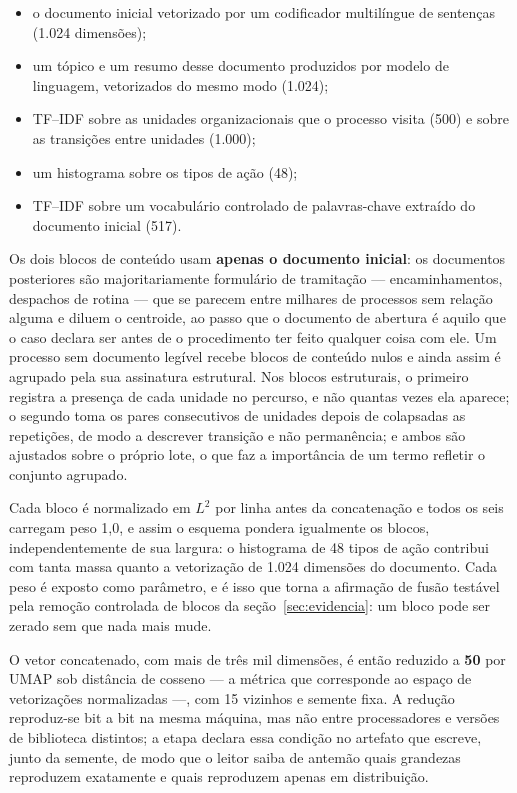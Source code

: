 \begin{itemize}
  \item o documento inicial vetorizado por um codificador multilíngue de sentenças
    \cite{chen2024bgem3} (1.024 dimensões);
  \item um tópico e um resumo desse documento produzidos por modelo de linguagem, vetorizados do
    mesmo modo (1.024);
  \item TF--IDF sobre as unidades organizacionais que o processo visita (500) e sobre as transições
    entre unidades (1.000);
  \item um histograma sobre os tipos de ação (48);
  \item TF--IDF sobre um vocabulário controlado de palavras-chave extraído do documento inicial
    (517).
\end{itemize}

Os dois blocos de conteúdo usam \textbf{apenas o documento inicial}: os
documentos posteriores são majoritariamente formulário de tramitação --- encaminhamentos, despachos
de rotina --- que se parecem entre milhares de processos sem relação alguma e diluem o centroide,
ao passo que o documento de abertura é aquilo que o caso declara ser antes de o procedimento ter
feito qualquer coisa com ele. Um processo sem documento legível recebe blocos de conteúdo nulos e
ainda assim é agrupado pela sua assinatura estrutural. Nos blocos estruturais, o primeiro registra a
presença de cada unidade no percurso, e não quantas vezes ela aparece; o segundo toma os pares
consecutivos de unidades depois de colapsadas as repetições, de modo a descrever transição e não
permanência; e ambos são ajustados sobre o próprio lote, o que faz a importância de um termo
refletir o conjunto agrupado.

Cada bloco é normalizado em $L^2$ por linha antes da concatenação e todos os seis carregam peso
1,0, e assim o esquema pondera igualmente os blocos, independentemente de sua largura: o
histograma de 48 tipos de ação contribui com tanta massa quanto a vetorização de 1.024 dimensões do
documento. Cada peso é exposto como parâmetro, e é isso que torna a afirmação de fusão testável
pela remoção controlada de blocos da seção~\ref{sec:evidencia}: um bloco pode ser zerado sem que
nada mais mude.

O vetor concatenado, com mais de três mil dimensões, é então reduzido a \textbf{50} por UMAP
\cite{mcinnes2018umap} sob distância de cosseno --- a métrica que corresponde ao espaço de
vetorizações normalizadas ---, com 15 vizinhos e semente fixa. A redução reproduz-se bit a bit na
mesma máquina, mas não entre processadores e versões de biblioteca distintos; a etapa declara essa
condição no artefato que escreve, junto da semente, de modo que o leitor saiba de antemão quais
grandezas reproduzem exatamente e quais reproduzem apenas em distribuição.

